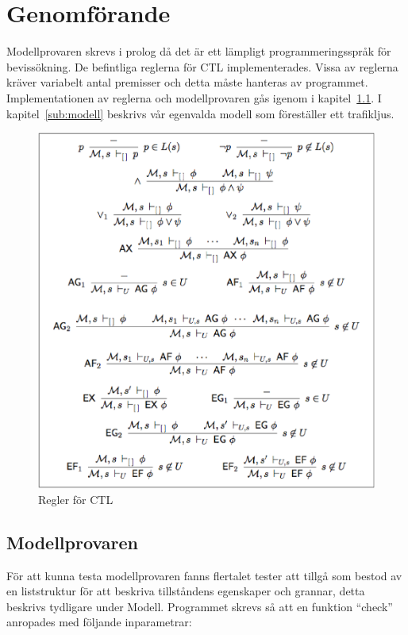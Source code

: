\section{Genomförande}
Modellprovaren skrevs i prolog då det är ett lämpligt programmeringsspråk för bevissökning. De befintliga reglerna för CTL implementerades. Vissa av reglerna kräver variabelt antal premisser och detta måste hanteras av programmet. Implementationen av reglerna och modellprovaren gås igenom i kapitel~\ref{sub:modellprovaren}. I kapitel~\ref{sub:modell} beskrivs vår egenvalda modell som föreställer ett trafikljus.

\begin{figure}[hb]
\includegraphics[width=\textwidth]{formulas.eps}
\caption{Regler för CTL}
\label{fig:ctl-regler}
\end{figure}
\subsection{Modellprovaren}\label{sub:modellprovaren}

För att kunna testa modellprovaren fanns flertalet tester att tillgå som bestod av en liststruktur för att beskriva tillståndens egenskaper och grannar, detta beskrivs tydligare under Modell.
Programmet skrevs så att en funktion “check” anropades med följande inparametrar:

